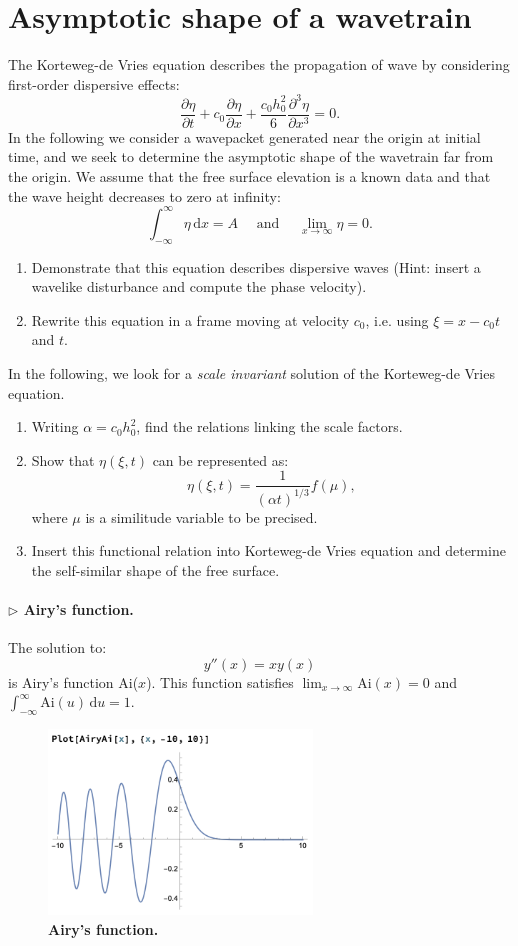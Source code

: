 \documentclass[11pt,a4paper]{article}
\newcommand{\lp}{\left(}
\newcommand{\rp}{\right)}
\newcommand{\prg}[1]{\paragraph{$\rhd$ #1}}
\begin{document}
\section{Asymptotic shape of a wavetrain}
The Korteweg-de Vries equation describes the propagation of wave by considering first-order dispersive effects:
\begin{equation}
\frac{\partial\eta}{\partial t}+c_0\frac{\partial \eta}{\partial x}+\frac{c_0 h_0^2}{6}\frac{\partial^3\eta}{\partial x^3}=0.
\end{equation}
In the following we consider a wavepacket generated near the origin at initial time, and we seek to determine the asymptotic shape of the wavetrain far from the origin. We assume that the free surface elevation is a known data and that the wave height decreases to zero at infinity:
\begin{equation}
\int_{-\infty}^{\infty} \eta \, \mathrm dx = A \quad \text{ and } \quad \lim_{x\to\infty} \eta = 0.
\end{equation}
\begin{enumerate}
\item Demonstrate that this equation describes dispersive waves (Hint: insert a wavelike disturbance and compute the phase velocity).
\item Rewrite this equation in a frame moving at velocity $c_0$, i.e. using $\xi = x - c_0t$ and $t$.
\end{enumerate}
In the following, we look for a \textit{scale invariant} solution of the Korteweg-de Vries equation.
\begin{enumerate}[resume]
\item Writing $\alpha = c_0 h_0^2$, find the relations linking the scale factors.
\item Show that $\eta(\xi,t)$ can be represented as:
\begin{equation}
\eta(\xi,t)=\frac{1}{\lp\alpha t\rp^{1/3}}f(\mu),
\end{equation}
where $\mu$ is a similitude variable to be precised.
\item Insert this functional relation into Korteweg-de Vries equation and determine the self-similar shape of the free surface.
\end{enumerate} 
\prg{Airy's function.} The solution to:
\begin{equation}
y''(x)=xy(x)
\end{equation}
is Airy's function Ai($x$). This function satisfies $\lim_{x\to\infty}\mathrm{Ai}(x) = 0$ and $\int_{-\infty}^\infty \mathrm{Ai}(u)\,\mathrm du = 1$.
\begin{figure}[ht]
    \centering
    \includegraphics[width=7cm]{airy.png}
    \caption{\textbf{Airy's function.}}
    \label{fig:airy}
\end{figure}


\end{document}
